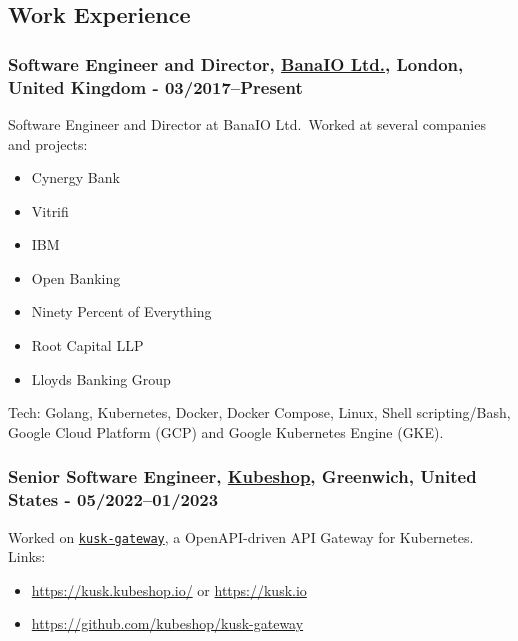 \documentclass[
  a4paper,
]{article}
\providecommand{\tightlist}{%
  \setlength{\itemsep}{0pt}\setlength{\parskip}{0pt}}
\begin{document}
\hypertarget{work-experience}{%
\subsection{Work Experience}\label{work-experience}}

\hypertarget{software-engineer-and-director-banaio-ltd.-london-united-kingdom---032017present}{%
\subsubsection{\texorpdfstring{Software Engineer and Director,
\href{https://bana.io}{BanaIO Ltd.}, London, United Kingdom -
03/2017--Present}{Software Engineer and Director, BanaIO Ltd., London, United Kingdom - 03/2017--Present}}\label{software-engineer-and-director-banaio-ltd.-london-united-kingdom---032017present}}

Software Engineer and Director at BanaIO Ltd.~Worked at several
companies and projects:

\begin{itemize}
\tightlist
\item
  Cynergy Bank
\item
  Vitrifi
\item
  IBM
\item
  Open Banking
\item
  Ninety Percent of Everything
\item
  Root Capital LLP
\item
  Lloyds Banking Group
\end{itemize}

Tech: Golang, Kubernetes, Docker, Docker Compose, Linux, Shell
scripting/Bash, Google Cloud Platform (GCP) and Google Kubernetes Engine
(GKE).

\hypertarget{senior-software-engineer-kubeshop-greenwich-united-states---052022012023}{%
\subsubsection{\texorpdfstring{Senior Software Engineer,
\href{https://kubeshop.io/}{Kubeshop}, Greenwich, United States -
05/2022--01/2023}{Senior Software Engineer, Kubeshop, Greenwich, United States - 05/2022--01/2023}}\label{senior-software-engineer-kubeshop-greenwich-united-states---052022012023}}

Worked on \href{https://docs.kusk.io/}{\texttt{kusk-gateway}}, a
OpenAPI-driven API Gateway for Kubernetes. Links:

\begin{itemize}
\tightlist
\item
  \url{https://kusk.kubeshop.io/} or \url{https://kusk.io}
\item
  \url{https://github.com/kubeshop/kusk-gateway}
\end{itemize}
\end{document}
